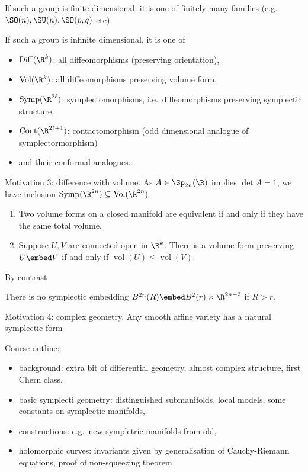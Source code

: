 \documentclass[a4paper]{article}
\begin{document}
\begin{theorem}[Lie]
  If such a group is finite dimensional, it is one of finitely many families (e.g.\ \(\SO(n), \SU(n), \SO(p, q)\) etc).
\end{theorem}

\begin{theorem}[Cartan]
  If such a group is infinite dimensional, it is one of
  \begin{itemize}
  \item \(\operatorname{Diff}(\R^k)\): all diffeomorphisms (preserving orientation),
  \item \(\operatorname{Vol}(\R^k)\): all diffeomorphisms preserving volume form,
  \item \(\operatorname{Symp}(\R^{2\ell})\): symplectomorphisms, i.e.\ diffeomorphisms preserving symplectic structure,
  \item \(\operatorname{Cont}(\R^{2\ell + 1})\): contactomorphism (odd dimensional analogue of symplectormorphism)
  \item and their conformal analogues.
  \end{itemize}
\end{theorem}

Motivation 3: difference with volume. As \(A \in \Sp_{2n}(\R)\) implies \(\det A = 1\), we have inclusion \(\operatorname{Symp}(\R^{2n}) \subseteq \operatorname{Vol}(\R^{2n})\).

\begin{theorem}[Moser]\leavevmode
  \begin{enumerate}
  \item Two volume forms on a closed manifold are equivalent if and only if they have the same total volume.
  \item Suppose \(U, V\) are connected open in \(\R^k\). There is a volume form-preserving \(U \embed V\) if and only if \(\operatorname{vol}(U) \leq \operatorname{vol}(V)\).
  \end{enumerate}
\end{theorem}

By contrast

\begin{theorem}
  There is no symplectic embedding \(B^{2n}(R) \embed B^2(r) \times \R^{2n - 2}\) if \(R > r\).
\end{theorem}

Motivation 4: complex geometry. Any smooth affine variety has a natural symplectic form

Course outline:
\begin{itemize}
\item background: extra bit of differential geometry, almost complex structure, first Chern class,
\item basic symplecti geometry: distinguished submanifolds, local models, some constants on symplectic manifolds,
\item constructions: e.g.\ new sympletric manifolds from old,
\item holomorphic curves: invariants given by generalisation of Cauchy-Riemann equations, proof of non-squeezing theorem
\end{itemize}
\end{document}
